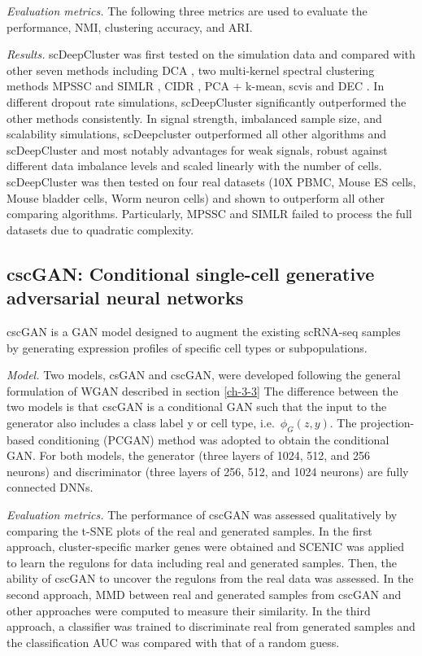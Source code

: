\documentclass[
]{book}
\begin{document}
\emph{Evaluation metrics.} The following three metrics are used to evaluate the performance, NMI, clustering accuracy, and ARI.

\emph{Results.} scDeepCluster was first tested on the simulation data and compared with other seven methods including DCA \citep{RN53}, two multi-kernel spectral clustering methods MPSSC \citep{RN135} and SIMLR \citep{RN38}, CIDR \citep{RN113}, PCA + k-mean, scvis \citep{RN127} and DEC \citep{RN253}. In different dropout rate simulations, scDeepCluster significantly outperformed the other methods consistently. In signal strength, imbalanced sample size, and scalability simulations, scDeepcluster outperformed all other algorithms and scDeepCluster and most notably advantages for weak signals, robust against different data imbalance levels and scaled linearly with the number of cells. scDeepCluster was then tested on four real datasets (10X PBMC, Mouse ES cells, Mouse bladder cells, Worm neuron cells) and shown to outperform all other comparing algorithms. Particularly, MPSSC and SIMLR failed to process the full datasets due to quadratic complexity.

\hypertarget{ch-5-3-7}{%
\subsection{cscGAN: Conditional single-cell generative adversarial neural networks}\label{ch-5-3-7}}

cscGAN \citep{RN139} is a GAN model designed to augment the existing scRNA-seq samples by generating expression profiles of specific cell types or subpopulations.

\emph{Model.} Two models, csGAN and cscGAN, were developed following the general formulation of WGAN described in section \ref{ch-3-3} The difference between the two models is that cscGAN is a conditional GAN such that the input to the generator also includes a class label y or cell type, i.e.~\(\phi_{G}(z,y)\). The projection-based conditioning (PCGAN) method \citep{RN140} was adopted to obtain the conditional GAN. For both models, the generator (three layers of 1024, 512, and 256 neurons) and discriminator (three layers of 256, 512, and 1024 neurons) are fully connected DNNs.

\emph{Evaluation metrics.} The performance of cscGAN was assessed qualitatively by comparing the t-SNE plots of the real and generated samples. In the first approach, cluster-specific marker genes were obtained and SCENIC \citep{RN252} was applied to learn the regulons for data including real and generated samples. Then, the ability of cscGAN to uncover the regulons from the real data was assessed. In the second approach, MMD between real and generated samples from cscGAN and other approaches were computed to measure their similarity. In the third approach, a classifier was trained to discriminate real from generated samples and the classification AUC was compared with that of a random guess.
\end{document}
